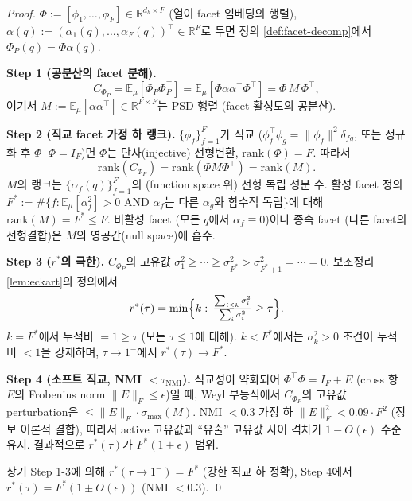 \documentclass[11pt]{article}
\theoremstyle{definition}
\newcommand{\R}{\mathbb{R}}
\newcommand{\E}{\mathbb{E}}
\newcommand{\Phip}{\Phi_P}
\newcommand{\dh}{d_h}
\begin{document}
\begin{proof}
$\Phi := [\phi_1, \dots, \phi_F] \in \R^{\dh\times F}$ (열이 facet 임베딩의 행렬), $\alpha(q) := (\alpha_1(q), \dots, \alpha_F(q))^\top \in \R^F$로 두면 정의 \ref{def:facet-decomp}에서 $\Phip(q) = \Phi \alpha(q)$.

\textbf{Step 1 (공분산의 facet 분해).}
\begin{equation}
C_{\Phip} = \E_\mu[\Phip\Phip^\top] = \E_\mu[\Phi \alpha \alpha^\top \Phi^\top] = \Phi \, M \, \Phi^\top,
\end{equation}
여기서 $M := \E_\mu[\alpha \alpha^\top] \in \R^{F\times F}$는 PSD 행렬 (facet 활성도의 공분산).

\textbf{Step 2 (직교 facet 가정 하 랭크).}
$\{\phi_f\}_{f=1}^F$가 직교 ($\phi_f^\top \phi_g = \|\phi_f\|^2 \delta_{fg}$, 또는 정규화 후 $\Phi^\top\Phi = I_F$)면 $\Phi$는 단사(injective) 선형변환, $\mathrm{rank}(\Phi) = F$. 따라서
\begin{equation}
\mathrm{rank}(C_{\Phip}) = \mathrm{rank}(\Phi M \Phi^\top) = \mathrm{rank}(M).
\end{equation}
$M$의 랭크는 $\{\alpha_f(q)\}_{f=1}^F$의 (function space 위) 선형 독립 성분 수. 활성 facet 정의 $F^* := \#\{f : \E_\mu[\alpha_f^2] > 0$ AND $\alpha_f$는 다른 $\alpha_g$와 함수적 독립$\}$에 대해 $\mathrm{rank}(M) = F^* \le F$. 비활성 facet (모든 $q$에서 $\alpha_f \equiv 0$)이나 종속 facet (다른 facet의 선형결합)은 $M$의 영공간(null space)에 흡수.

\textbf{Step 3 ($r^*$의 극한).}
$C_{\Phip}$의 고유값 $\sigma_1^2 \ge \cdots \ge \sigma_{F^*}^2 > \sigma_{F^*+1}^2 = \cdots = 0$. 보조정리 \ref{lem:eckart}의 정의에서
\begin{equation}
r^*(\tau) = \min\Bigl\{k:\, \tfrac{\sum_{i\le k}\sigma_i^2}{\sum_{i}\sigma_i^2} \ge \tau\Bigr\}.
\end{equation}
$k = F^*$에서 누적비 $= 1 \ge \tau$ (모든 $\tau \le 1$에 대해). $k < F^*$에서는 $\sigma_k^2 > 0$ 조건이 누적비 $< 1$을 강제하며, $\tau \to 1^-$에서 $r^*(\tau) \to F^*$.

\textbf{Step 4 (소프트 직교, NMI $< \tau_{\mathrm{NMI}}$).}
직교성이 약화되어 $\Phi^\top\Phi = I_F + E$ (cross 항 $E$의 Frobenius norm $\|E\|_F \le \epsilon$)일 때, Weyl 부등식에서 $C_{\Phip}$의 고유값 perturbation은 $\le \|E\|_F \cdot \sigma_{\max}(M)$. NMI $< 0.3$ 가정 하 $\|E\|_F^2 < 0.09 \cdot F^2$ (정보 이론적 결합), 따라서 active 고유값과 ``유출'' 고유값 사이 격차가 $1 - O(\epsilon)$ 수준 유지. 결과적으로 $r^*(\tau)$가 $F^*(1 \pm \epsilon)$ 범위.

상기 Step 1-3에 의해 $r^*(\tau\to 1^-) = F^*$ (강한 직교 하 정확), Step 4에서 $r^*(\tau) = F^*(1 \pm O(\epsilon))$ (NMI $< 0.3$). \qed
\end{proof}
\end{document}
